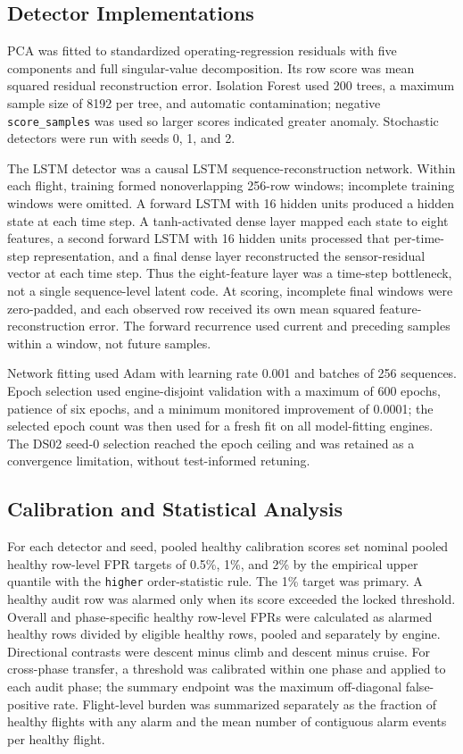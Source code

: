 \documentclass[10pt,conference]{IEEEtran}
\begin{document}
\subsection{Detector Implementations}\label{detector-implementations}

PCA was fitted to standardized operating-regression residuals with five components and full singular-value decomposition. Its row score was mean squared residual reconstruction error. Isolation Forest used 200 trees, a maximum sample size of 8192 per tree, and automatic contamination; negative \texttt{score\_samples} was used so larger scores indicated greater anomaly. Stochastic detectors were run with seeds 0, 1, and 2.

The LSTM detector was a causal LSTM sequence-reconstruction network. Within each flight, training formed nonoverlapping 256-row windows; incomplete training windows were omitted. A forward LSTM with 16 hidden units produced a hidden state at each time step. A tanh-activated dense layer mapped each state to eight features, a second forward LSTM with 16 hidden units processed that per-time-step representation, and a final dense layer reconstructed the sensor-residual vector at each time step. Thus the eight-feature layer was a time-step bottleneck, not a single sequence-level latent code. At scoring, incomplete final windows were zero-padded, and each observed row received its own mean squared feature-reconstruction error. The forward recurrence used current and preceding samples within a window, not future samples.

Network fitting used Adam with learning rate 0.001 and batches of 256 sequences. Epoch selection used engine-disjoint validation with a maximum of 600 epochs, patience of six epochs, and a minimum monitored improvement of 0.0001; the selected epoch count was then used for a fresh fit on all model-fitting engines. The DS02 seed-0 selection reached the epoch ceiling and was retained as a convergence limitation, without test-informed retuning.

\subsection{Calibration and Statistical Analysis}\label{calibration-and-statistical-analysis}

For each detector and seed, pooled healthy calibration scores set nominal pooled healthy row-level FPR targets of 0.5\%, 1\%, and 2\% by the empirical upper quantile with the \texttt{higher} order-statistic rule. The 1\% target was primary. A healthy audit row was alarmed only when its score exceeded the locked threshold. Overall and phase-specific healthy row-level FPRs were calculated as alarmed healthy rows divided by eligible healthy rows, pooled and separately by engine. Directional contrasts were descent minus climb and descent minus cruise. For cross-phase transfer, a threshold was calibrated within one phase and applied to each audit phase; the summary endpoint was the maximum off-diagonal false-positive rate. Flight-level burden was summarized separately as the fraction of healthy flights with any alarm and the mean number of contiguous alarm events per healthy flight.
\end{document}

